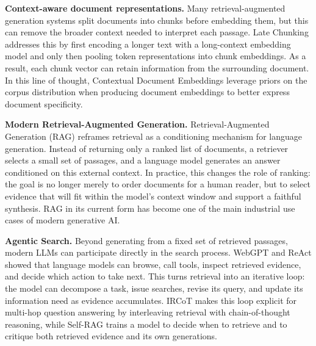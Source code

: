 \noindent\textbf{Context-aware document representations.}
Many retrieval-augmented generation systems split documents into chunks before embedding them, but this can remove the broader context needed to interpret each passage. Late Chunking  addresses this by first encoding a longer text with a long-context embedding model and only then pooling token representations into chunk embeddings. As a result, each chunk vector can retain information from the surrounding document.
In this line of thought, Contextual Document Embeddings  leverage priors on the corpus distribution when producing document embeddings to better express document specificity.


\noindent\textbf{Modern Retrieval-Augmented Generation.}
Retrieval-Augmented Generation (RAG) \cite{lewis_retrieval-augmented_2020} reframes retrieval as a conditioning mechanism for language generation. Instead of returning only a ranked list of documents, a retriever selects a small set of passages, and a language model generates an answer conditioned on this external context.
In practice, this changes the role of ranking: the goal is no longer merely to order documents for a human reader, but to select evidence that will fit within the model's context window and support a faithful synthesis. RAG in its current form has become one of the main industrial use cases of modern generative AI.


\noindent\textbf{Agentic Search.}
Beyond generating from a fixed set of retrieved passages, modern LLMs can participate directly in the search process. WebGPT  and ReAct  showed that language models can browse, call tools, inspect retrieved evidence, and decide which action to take next. This turns retrieval into an iterative loop: the model can decompose a task, issue searches, revise its query, and update its information need as evidence accumulates. IRCoT  makes this loop explicit for multi-hop question answering by interleaving retrieval with chain-of-thought reasoning, while Self-RAG  trains a model to decide when to retrieve and to critique both retrieved evidence and its own generations.


